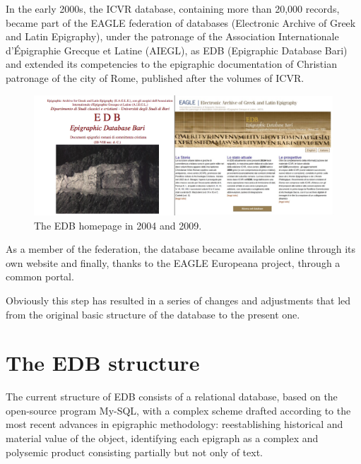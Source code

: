 \documentclass[amsthm,ebook]{saparticle}
\begin{document}
In the early 2000s, the ICVR database, containing more than 20,000 records, became part of the EAGLE federation of
databases (Electronic Archive of Greek and Latin Epigraphy), under the patronage of the Association Internationale
d’Épigraphie Grecque et Latine (AIEGL), as EDB (Epigraphic Database Bari) and extended its competencies to the
epigraphic documentation of Christian patronage of the city of Rome, published after the volumes of ICVR. 

\begin{figure}[hbp]
\centering
 \includegraphics[width=\columnwidth]{EAGLE2016Roccoengrev-img003.png} 
\caption{The EDB homepage in 2004 and 2009.}
\label{fig:3}
\end{figure}



As a member of the federation, the database became available online through its own website and finally, thanks to the
EAGLE Europeana project, through a common portal.

Obviously this step has resulted in a series of changes and adjustments that led from the original basic structure of
the database to the present one. 

\section{The EDB structure}


The current structure of EDB consists of a relational database, based on the open-source program My-SQL, with a complex
scheme drafted according to the most recent advances in epigraphic methodology: reestablishing historical and material
value of the object, identifying each epigraph as a complex and polysemic product consisting partially but not only of
text.
\end{document}
